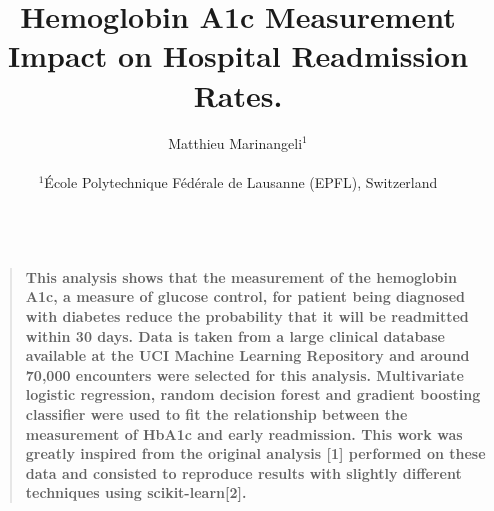 \documentclass[12pt]{article}
\title{Hemoglobin A1c Measurement Impact on Hospital Readmission Rates.}
\author
{Matthieu Marinangeli$^{1}$\\
\\
\normalsize{$^{1}$\'Ecole Polytechnique F\'ed\'erale de Lausanne (EPFL), Switzerland}\\
\\
}
\date{}
\newenvironment{sciabstract}{%
\begin{quote} \bf}
{\end{quote}}
\begin{document}
 


\baselineskip24pt


\maketitle 




\begin{sciabstract}
  This analysis shows that the measurement of the hemoglobin A1c,  a measure of glucose control, for patient being diagnosed with diabetes reduce the probability that it will be readmitted within 30 days. Data is taken from a large clinical database available at the UCI Machine Learning Repository and around 70,000 encounters were selected for this analysis. Multivariate logistic regression, random decision forest and gradient boosting classifier were used to fit the relationship between the measurement of HbA1c and early readmission. This work was greatly inspired from the original analysis [1] performed on these data and consisted to reproduce results with slightly different techniques using scikit-learn[2].
\end{sciabstract}



\end{document}
